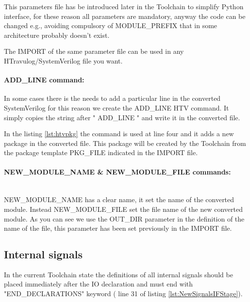 {{{{                This parameters file has be introduced later in the Toolchain to simplify Python interface, for these reason all parameters are mandatory, anyway the code can be changed e.g., avoiding compulsory of MODULE\_PREFIX that in some architecture probably doesn't exist. 
                
                The IMPORT of the same parameter file can be used in any HTravulog/SystemVerilog file you want.
            
            } %
                
            \paragraph{ADD\_LINE command:}{
                In some cases there is the needs to add a particular line in the converted SystemVerilog for this reason we create the ADD\_LINE HTV command.
                It simply copies the string after "\/\/\/\/ ADD\_LINE " and write it in the converted file.
                
                In the listing \ref{lst:htvpkg} the command is used at line four and it adds a new package in the converted file.
                This package will be created by the Toolchain from the package template PKG\_FILE indicated in the IMPORT file.
            }%
            
            \paragraph{NEW\_MODULE\_NAME \& NEW\_MODULE\_FILE commands:}{
                \mbox{}\\
                 NEW\_MODULE\_NAME has a clear name, it set the name of the converted module. Instead NEW\_MODULE\_FILE set the file name of the new converted module. As you can see we use the OUT\_DIR parameter in the definition of the name of the file, this parameter has been set previously in the IMPORT file. 
                
            }%
            
        }%
        \subsection{Internal signals}{
            \label{InternalSignals}
            In the current Toolchain state the definitions of all internal signals should be placed immediately after the IO declaration and must end with  "END\_DECLARATIONS" keyword ( line 31 of listing \ref{lst:NewSignalsIFStage}). 
            
}}}
